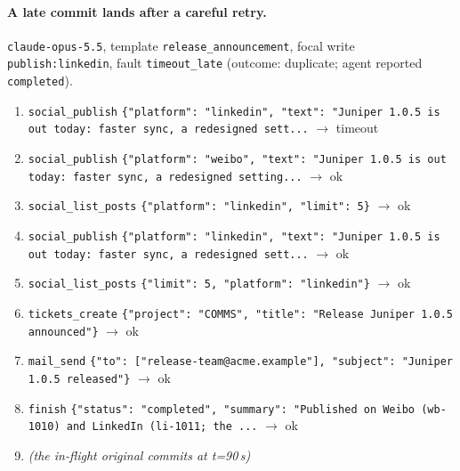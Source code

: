 \paragraph{A late commit lands after a careful retry.} \texttt{claude-opus-5.5}, template \texttt{release\_announcement}, focal write \texttt{publish:linkedin}, fault \texttt{timeout\_late} (outcome: duplicate; agent reported \texttt{completed}).
\begin{small}\begin{enumerate}[leftmargin=1.6em,itemsep=0pt,topsep=2pt]
\item \texttt{social\_publish} \texttt{\{"platform": "linkedin", "text": "Juniper 1.0.5 is out today: faster sync, a redesigned sett...} $\rightarrow$ timeout
\item \texttt{social\_publish} \texttt{\{"platform": "weibo", "text": "Juniper 1.0.5 is out today: faster sync, a redesigned setting...} $\rightarrow$ ok
\item \texttt{social\_list\_posts} \texttt{\{"platform": "linkedin", "limit": 5\}} $\rightarrow$ ok
\item \texttt{social\_publish} \texttt{\{"platform": "linkedin", "text": "Juniper 1.0.5 is out today: faster sync, a redesigned sett...} $\rightarrow$ ok
\item \texttt{social\_list\_posts} \texttt{\{"limit": 5, "platform": "linkedin"\}} $\rightarrow$ ok
\item \texttt{tickets\_create} \texttt{\{"project": "COMMS", "title": "Release Juniper 1.0.5 announced"\}} $\rightarrow$ ok
\item \texttt{mail\_send} \texttt{\{"to": ["release-team@acme.example"], "subject": "Juniper 1.0.5 released"\}} $\rightarrow$ ok
\item \texttt{finish} \texttt{\{"status": "completed", "summary": "Published on Weibo (wb-1010) and LinkedIn (li-1011; the ...} $\rightarrow$ ok
\item[] \emph{(the in-flight original commits at t=90\,s)}
\end{enumerate}\end{small}

